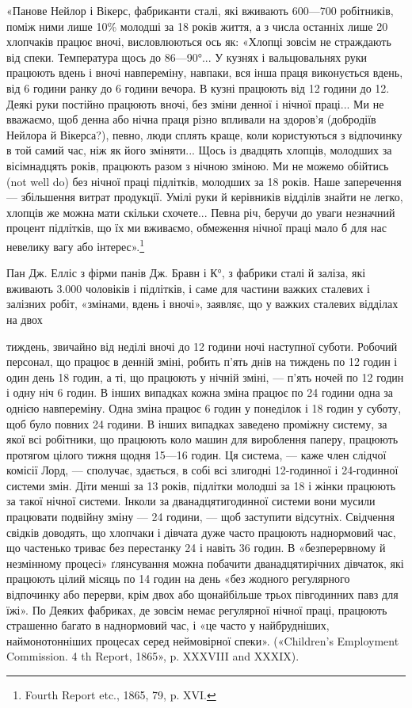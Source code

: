 «Панове Нейлор і Вікерс, фабриканти сталі, які вживають
600—700 робітників, поміж ними лише 10\% молодші за 18 років
життя, а з числа останніх лише 20 хлопчаків працює вночі,
висловлюються ось як: «Хлопці зовсім не страждають від спеки.
Температура щось до 86—90°... У кузнях і вальцювальнях
руки працюють вдень і вночі навпереміну, навпаки, вся інша
праця виконується вдень, від 6 години ранку до 6 години вечора.
В кузні працюють від 12 години до 12. Деякі руки постійно працюють
вночі, без зміни денної і нічної праці... Ми не вважаємо,
щоб денна або нічна праця різно впливали на здоров’я (добродіїв
Нейлора й Вікерса?), певно, люди сплять краще, коли користуються
з відпочинку в той самий час, ніж як його зміняти...
Щось із двадцять хлопців, молодших за вісімнадцять років,
працюють разом з нічною зміною. Ми не можемо обійтись (not
well do) без нічної праці підлітків, молодших за 18 років. Наше
заперечення — збільшення витрат продукції. Умілі руки й
керівників відділів знайти не легко, хлопців же можна мати
скільки схочете... Певна річ, беручи до уваги незначний процент
підлітків, що їх ми вживаємо, обмеження нічної праці мало б
для нас невелику вагу або інтерес».\footnote{
Fourth Report etc., 1865, 79, p. XVI.
}

Пан Дж. Елліс з фірми панів Дж. Бравн і К°, з фабрики
сталі й заліза, які вживають 3.000 чоловіків і підлітків,
і саме для частини важких сталевих і залізних робіт, «змінами,
вдень і вночі», заявляє, що у важких сталевих відділах на двох

тиждень, звичайно від неділі вночі до 12 години ночі наступної суботи.
Робочий персонал, що працює в денній зміні, робить п’ять днів на тиждень
по 12 годин і один день 18 годин, а ті, що працюють у нічній зміні, — п’ять
ночей по 12 годин і одну ніч 6 годин. В інших випадках кожна зміна працює
по 24 години одна за однією навпереміну. Одна зміна працює 6 годин у
понеділок і 18 годин у суботу, щоб було повних 24 години. В інших випадках
заведено проміжну систему, за якої всі робітники, що працюють
коло машин для вироблення паперу, працюють протягом цілого тижня
щодня 15—16 годин. Ця система, — каже член слідчої комісії Лорд, —
сполучає, здається, в собі всі злигодні 12-годинної і 24-годинної системи
змін. Діти менші за 13 років, підлітки молодші за 18 і жінки працюють
за такої нічної системи. Інколи за дванадцятигодинної системи вони
мусили працювати подвійну зміну — 24 години, — щоб заступити відсутніх.
Свідчення свідків доводять, що хлопчаки і дівчата дуже часто працюють
наднормовий час, що частенько триває без перестанку 24 і навіть 36 годин.
В «безперервному й незмінному процесі» ґлянсування можна побачити
дванадцятирічних дівчаток, які працюють цілий місяць по 14 годин на
день «без жодного регулярного відпочинку або перерви, крім двох або
щонайбільше трьох півгодинних павз для їжі». По Деяких фабриках, де
зовсім немає регулярної нічної праці, працюють страшенно багато в наднормовий
час, і «це часто у найбрудніших, наймонотонніших процесах
серед неймовірної спеки». («Children’s Employment Commission. 4 th
Report, 1865», p. XXXVIII and XXXIX).
\parbreak{}  %
